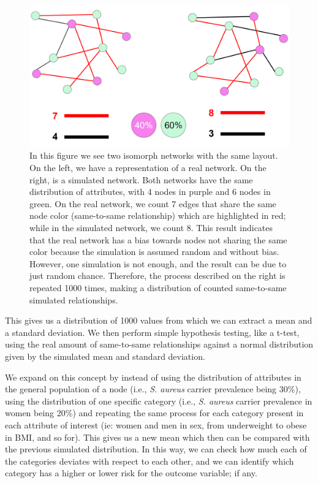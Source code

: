     \begin{figure}[H]
        \centering
            \includegraphics[width=0.7\linewidth]{figures/Methodology/Simulations1.png } 
        \caption{In this figure we see two isomorph networks with the same layout. On the left, we have a representation of a real network. On the right, is a simulated network. Both networks have the same distribution of attributes, with 4 nodes in purple and 6 nodes in green. On the real network, we count 7 edges that share the same node color (same-to-same relationship) which are highlighted in red; while in the simulated network, we count 8. This result indicates that the real network has a bias towards nodes not sharing the same color because the simulation is assumed random and without bias. However, one simulation is not enough, and the result can be due to just random chance. Therefore, the process described on the right is repeated 1000 times, making a distribution of counted same-to-same simulated relationships.}
        \label{figure:methodSimulations1}
    \end{figure}

This gives us a distribution of 1000 values from which we can extract a mean and a standard deviation. We then perform simple hypothesis testing, like a t-test, using the real amount of same-to-same relationships against a normal distribution given by the simulated mean and standard deviation. 

We expand on this concept by instead of using the distribution of attributes in the general population of a node (i.e., \textit{S. aureus} carrier prevalence being 30\%), using the distribution of one specific category (i.e., \textit{S. aureus} carrier prevalence in women being 20\%) and repeating the same process for each category present in each attribute of interest (ie: women and men in sex, from underweight to obese in BMI, and so for). This gives us a new mean which then can be compared with the previous simulated distribution. In this way, we can check how much each of the categories deviates with respect to each other, and we can identify which category has a higher or lower risk for the outcome variable; if any.

